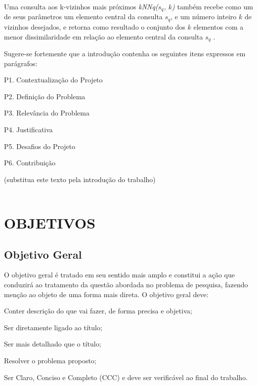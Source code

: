 Uma consulta aos k-vizinhos mais próximos \textit{kNNq($s_q$, $k$)} também recebe como um de seus parâmetros um elemento central da consulta $s_q$, e um número inteiro $k$ de vizinhos desejados, e retorna
como resultado o conjunto dos $k$ elementos com a menor dissimilaridade em relação ao elemento central da consulta $s_q$ \cite{POLA2010}. 

Sugere-se fortemente que a  introdução contenha os seguintes itens expressos em parágrafos:


P1. Contextualização do Projeto

P2. Definição do Problema

P3. Relevância do Problema

P4. Justificativa

P5. Desafios do Projeto

P6. Contribuição

(substitua este texto pela introdução do trabalho) \\ \\

{\let\clearpage\relax \chapter{OBJETIVOS}}
\label{chap:objetivos}

\section{Objetivo Geral}
\label{sec:objgeral}
O objetivo geral é tratado em seu sentido mais amplo e constitui a ação que conduzirá ao tratamento da questão abordada no problema de pesquisa, fazendo menção ao objeto de uma forma mais direta. O objetivo geral deve:

Conter descrição do que vai fazer, de forma precisa e objetiva;

Ser diretamente ligado ao título;

Ser mais detalhado que o título;

Resolver o problema proposto;

Ser Claro, Conciso e Completo (CCC) e deve ser verificável ao final do trabalho.

